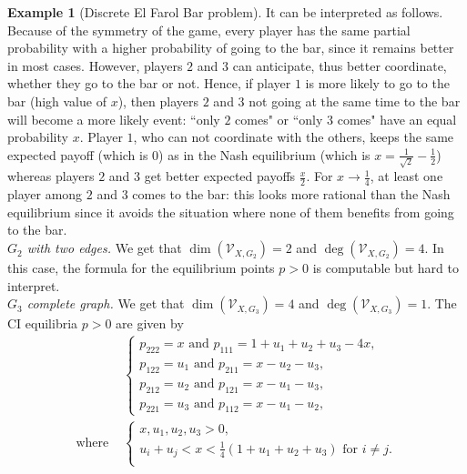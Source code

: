 \documentclass[11pt]{amsart}
\numberwithin{equation}{section}
\theoremstyle{plain}
\numberwithin{theorem}{section}
\theoremstyle{definition}
\newtheorem{example}[theorem]{Example}
\begin{document}
\begin{example}[Discrete El Farol Bar problem]
It can be interpreted as follows. Because of the symmetry of the game, every player has the same partial probability with a higher probability of going to the bar, since it remains better in most cases. However, players $2$ and $3$ can anticipate, thus better coordinate, whether they go to the bar or not. Hence, if player $1$ is more likely to go to the bar (high value of $x$), then players $2$ and $3$ not going at the same time to the bar will become a more likely event: ``only $2$ comes" or ``only $3$ comes" have an equal probability $x$. Player $1$, who can not coordinate with the others, keeps the same expected payoff (which is $0$) as in the Nash equilibrium (which is $x=\frac1{\sqrt2}-\frac12$) whereas players $2$ and $3$ get better expected payoffs $\frac x2$. For $x\rightarrow\frac14$, at least one player among $2$ and $3$ comes to the bar: this looks more rational than the Nash equilibrium since it avoids the situation where none of them benefits from going to the bar.
\\
\indent \emph{$G_2$ with two edges.} We get that $\dim(\mathcal V_{X,G_2})=2$ and $\deg(\mathcal V_{X,G_2})=4$. In this case, the formula for the equilibrium points $p>0$ is computable but hard to interpret.\\
\indent \emph{$G_3$ complete graph.} We get that  $\dim(\mathcal V_{X,G_3})=4$ and $\deg(\mathcal V_{X,G_3})=1$. The CI equilibria $p>0$ are given by
    \begin{align*}
    &\left\{\begin{array}{l}
         p_{222}=x\text{ and }p_{111}=1+u_1+u_2+u_3-4x ,\\
          p_{122}=u_1\text{ and }p_{211}=x-u_2-u_3,\\
          p_{212}=u_2\text{ and }p_{121}=x-u_1-u_3,\\
          p_{221}=u_3\text{ and }p_{112}=x-u_1-u_2,
    \end{array}\right.\\
    \text{where }&\left\{\begin{array}{l}
          x,u_1,u_2,u_3>0, \\
          u_i+u_j<x<\frac14(1+u_1+u_2+u_3)\text{ for }i\ne j.\\
    \end{array}\right.
\end{align*}
 
\end{example}
\end{document}

